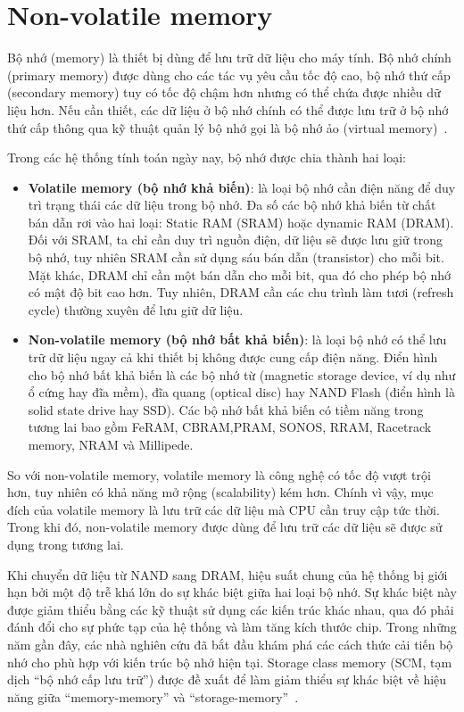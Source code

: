 \section{Non-volatile memory}
\label{chap:non-volatile-memory}

Bộ nhớ (memory) là thiết bị dùng để lưu trữ dữ liệu cho máy tính. Bộ nhớ chính
(primary memory) được dùng cho các tác vụ yêu cầu tốc độ cao, bộ nhớ thứ cấp
(secondary memory) tuy có tốc độ chậm hơn nhưng có thể chứa được nhiều dữ liệu
hơn. Nếu cần thiết, các dữ liệu ở bộ nhớ chính có thể được lưu trữ ở bộ nhớ thứ
cấp thông qua kỹ thuật quản lý bộ nhớ gọi là bộ nhớ ảo (virtual
memory)~\cite{VolatileNonVolatileComputer}.

Trong các hệ thống tính toán ngày nay, bộ nhớ được chia thành hai loại:

\begin{itemize}
    \item \textbf{Volatile memory (bộ nhớ khả biến)}: là loại bộ nhớ cần điện
    năng để duy trì trạng thái các dữ liệu trong bộ nhớ. Đa số các bộ nhớ khả
    biến từ chất bán dẫn rơi vào hai loại: Static RAM (SRAM) hoặc dynamic RAM
    (DRAM). Đối với SRAM, ta chỉ cần duy trì nguồn điện, dữ liệu sẽ được lưu giữ
    trong bộ nhớ, tuy nhiên SRAM cần sử dụng sáu bán dẫn (transistor) cho mỗi
    bit. Mặt khác, DRAM chỉ cần một bán dẫn cho mỗi bit, qua đó cho phép bộ nhớ
    có mật độ bit cao hơn. Tuy nhiên, DRAM cần các chu trình làm tươi (refresh
    cycle) thường xuyên để lưu giữ dữ liệu.
    
    \item \textbf{Non-volatile memory (bộ nhớ bất khả biến)}: là loại bộ nhớ có
    thể lưu trữ dữ liệu ngay cả khi thiết bị không được cung cấp điện năng.
    Điển hình cho bộ nhớ bất khả biến là các bộ nhớ từ (magnetic storage
    device, ví dụ như ổ cứng hay đĩa mềm), đĩa quang (optical disc) hay NAND
    Flash (điển hình là solid state drive hay SSD). Các bộ nhớ bất khả biến có
    tiềm năng trong tương lai bao gồm FeRAM, CBRAM,PRAM, SONOS, RRAM, Racetrack
    memory, NRAM và Millipede.
\end{itemize}

So với non-volatile memory, volatile memory là công nghệ có tốc độ vượt trội
hơn, tuy nhiên có khả năng mở rộng (scalability) kém hơn. Chính vì vậy, mục đích
của volatile memory là lưu trữ các dữ liệu mà CPU cần truy cập tức thời. Trong
khi đó, non-volatile memory được dùng để lưu trữ các dữ liệu sẽ được sử dụng
trong tương lai.

Khi chuyển dữ liệu từ NAND sang DRAM, hiệu suất chung của hệ thống bị giới hạn
bởi một độ trễ khá lớn do sự khác biệt giữa hai loại bộ nhớ. Sự khác biệt này
được giảm thiểu bằng các kỹ thuật sử dụng các kiến trúc khác nhau, qua đó phải
đánh đổi cho sự phức tạp của hệ thống và làm tăng kích thước chip. Trong những
năm gần đây, các nhà nghiên cứu đã bắt đầu khám phá các cách thức cải tiến bộ
nhớ cho phù hợp với kiến trúc bộ nhớ hiện tại. Storage class memory (SCM, tạm
dịch ``bộ nhớ cấp lưu trữ'') được đề xuất để làm giảm thiểu sự khác biệt về hiệu
năng giữa ``memory-memory'' và
``storage-memory''~\cite{gouxOxRAMTechnologyDevelopment2019}.

